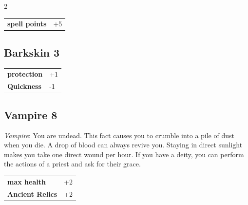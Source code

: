 \begin{multicols}{2}
\begin{tcolorbox}
\begin{tabular}{@{}ll@{}}
    \textbf{spell points} & +5\\
\end{tabular}


\end{tcolorbox}

\begin{tcolorbox}
    \subsection*{Barkskin \hfill \small{3 }}
    \tcblower




\begin{tabular}{@{}ll@{}}
    \textbf{protection} & +1\\
    \textbf{Quickness} & -1\\
\end{tabular}


\end{tcolorbox}

\begin{tcolorbox}
    \subsection*{Vampire \hfill \small{8 }}
    \tcblower
\textit{Vampire}: You are undead. This fact causes you to crumble into a pile of dust when you die. A drop of blood can always revive you. Staying in direct sunlight makes you take one direct wound per hour. If you have a deity, you can perform the actions of a priest and ask for their grace.


\vspace{3mm}

\begin{tabular}{@{}ll@{}}
    \textbf{max health} & +2\\
    \textbf{Ancient Relics} & +2\\
\end{tabular}



\end{tcolorbox}
\end{multicols}
